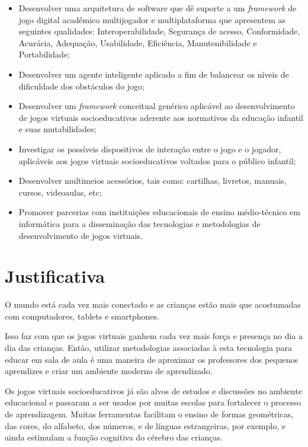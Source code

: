 \documentclass[article,12pt,openany,oneside,a4paper,english,brazil]{abntex2}
\begin{document}
\begin{itemize}
    \item Desenvolver uma arquitetura de software que dê suporte a um \textit{framework} de jogo digital acadêmico multijogador e multiplataforma que apresentem as seguintes qualidades: Interoperabilidade, Segurança de acesso, Conformidade, Acurácia, Adequação, Usabilidade, Eficiência, Manutenibilidade e Portabilidade;
    \item Desenvolver um agente inteligente aplicado a fim de balancear os níveis de dificuldade dos obstáculos do jogo;
    \item Desenvolver um \textit{framework} conceitual genérico aplicável ao desenvolvimento de jogos virtuais socioeducativos aderente aos normativos da educação infantil e suas mutabilidades;
    \item Investigar os possíveis dispositivos de interação entre o jogo e o jogador, aplicáveis aos jogos virtuais socioeducativos voltados para o público infantil;
    \item Desenvolver multimeios acessórios, tais como: cartilhas, livretos, manuais, cursos, videoaulas, etc;
    \item Promover parcerias com instituições educacionais de ensino médio-técnico em informática para a disseminação das tecnologias e metodologias de desenvolvimento de jogos virtuais.
\end{itemize}

\section{Justificativa}
\label{sc:just}

O mundo está cada vez mais conectado e as crianças estão mais que acostumadas com computadores, tablets e smartphones. 

Isso faz com que os jogos virtuais ganhem cada vez mais força e presença no dia a dia das crianças. Então, utilizar metodologias associadas à esta tecnologia para educar em sala de aula é uma maneira de aproximar os professores dos pequenos aprendizes e criar um ambiente moderno de aprendizado.

Os jogos virtuais socioeducativos já são alvos de estudos e discussões no ambiente educacional e passaram a ser usados por muitas escolas para fortalecer o processo de aprendizagem.
Muitas ferramentas facilitam o ensino de formas geométricas, das cores, do alfabeto, dos números, e de línguas estrangeiras, por exemplo, e ainda estimulam a função cognitiva do cérebro das crianças.
\end{document}
